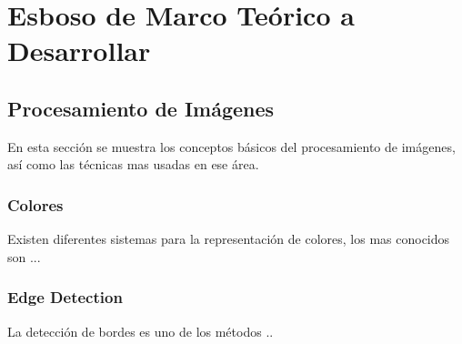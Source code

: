 \chapter{Esboso de Marco Teórico a Desarrollar}
\label{chp:marco-teorico}
\section{Procesamiento de Imágenes}
En esta sección se muestra los conceptos básicos del procesamiento de imágenes, así como las técnicas mas usadas en ese área.
\subsection{Colores}
Existen diferentes sistemas para la representación de colores, los mas conocidos son ...


\subsection{Edge Detection}
La detección de bordes es uno de los métodos ..

